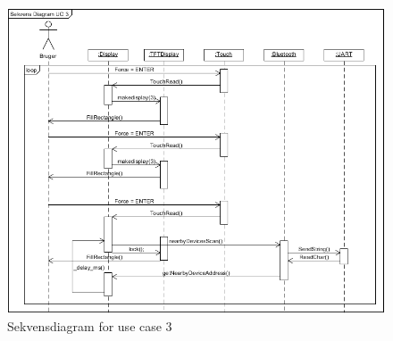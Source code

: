 \begin{figure}[H]
	\centering
	\includegraphics[width = 400 pt]{Img/SD3.png}
	\caption{Sekvensdiagram for use case 3}
	\label{fig:SD3}
\end{figure}
\newpage

